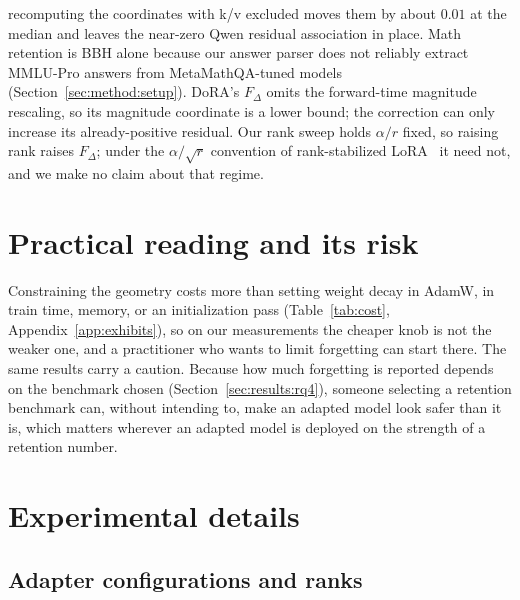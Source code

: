 \documentclass[11pt]{article}
\newcommand{\dw}{F_{\Delta}}
\begin{document}
\begin{enumerate}
        recomputing the coordinates with k/v excluded moves them by about
        $0.01$ at the median and leaves the near-zero Qwen residual
        association in place. Math retention is BBH alone
        because our answer parser does not reliably extract MMLU-Pro answers
        from MetaMathQA-tuned models (Section~\ref{sec:method:setup}). DoRA's
        $\dw$ omits the forward-time magnitude rescaling, so its magnitude
        coordinate is a lower bound; the correction can only increase its
        already-positive residual. Our rank sweep holds $\alpha/r$ fixed, so
        raising rank raises $\dw$; under the $\alpha/\sqrt{r}$ convention of
        rank-stabilized LoRA~\citep{kalajdzievski2023rslora} it need not, and
        we make no claim about that regime.
\end{enumerate}

\section*{Practical reading and its risk}
Constraining the geometry costs more than setting weight decay in AdamW, in
train time, memory, or an initialization pass (Table~\ref{tab:cost},
Appendix~\ref{app:exhibits}), so on our measurements the cheaper knob is not
the weaker one, and a practitioner who wants to limit forgetting can start
there. The same results carry a caution. Because how much forgetting is
reported depends on the benchmark chosen
(Section~\ref{sec:results:rq4}), someone selecting a retention benchmark can,
without intending to, make an adapted model look safer than it is, which
matters wherever an adapted model is deployed on the strength of a retention
number.



\appendix
\section{Experimental details}\label{app:details}
\subsection{Adapter configurations and ranks}\label{app:configs}
\end{document}
